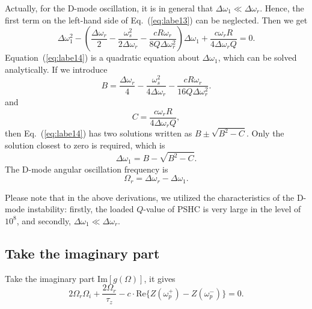 \documentclass[%
 reprint,
 amsmath,amssymb,
 aps,
]{revtex4-1}
\begin{document}
Actually, for the D-mode oscillation, it is in general that $\Delta\omega_1 \ll \Delta\omega_r$. Hence, the first term on the left-hand side of Eq.~(\ref{eq:labe13}) can be neglected. Then we get
\begin{equation}\label{eq:labe14}
   \Delta\omega^2_1-(\frac{\Delta\omega_r}{2}-\frac{\omega^2_s}{2\Delta\omega_r}-\frac{cR\omega_r}{8Q\Delta\omega^2_r})\Delta\omega_1+\frac{c\omega_r R}{4\Delta\omega_rQ}=0.
\end{equation}
Equation~(\ref{eq:labe14}) is a quadratic equation about $\Delta\omega_1$, which can be solved analytically. If we introduce
\begin{equation}\label{eq:labe15}
   B=\frac{\Delta\omega_r}{4}-\frac{\omega^2_s}{4\Delta\omega_r}-\frac{cR\omega_r}{16Q\Delta\omega^2_r}.
\end{equation}
and
\begin{equation}\label{eq:labe16}
   C= \frac{c\omega_r R}{4\Delta\omega_r Q},
\end{equation}
then  Eq.~(\ref{eq:labe14}) has two solutions written as $B\pm \sqrt{B^2-C}$. Only the solution closest to zero is required, which is 
\begin{equation}\label{eq:labe17}
   \Delta\omega_1= B-\sqrt{B^2-C}.
\end{equation}
The D-mode angular oscillation frequency is 
\begin{equation}\label{eq:labe18}
   \Omega_r= \Delta\omega_r-\Delta\omega_1.
\end{equation}

Please note that in the above derivations, we utilized the characteristics of the D-mode instability: firstly, the loaded $Q$-value of PSHC is very large in the level of $10^{8}$, and secondly, $\Delta\omega_1 \ll \Delta\omega_r$.

\subsection{\label{sec:level3.2} Take the imaginary part}
Take the imaginary part $\mathrm {Im}[g(\Omega)]$, it gives
\begin{equation}\label{eq:labe19}
   2\Omega_r\Omega_i+\frac{2\Omega_r}{\tau_z}-c \cdot \mathrm {Re}\{Z(\omega^{+}_p)-Z(\omega^{-}_p)\}=0.
\end{equation}
\end{document}
